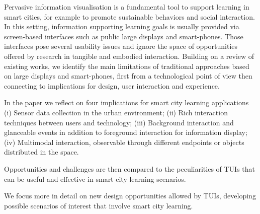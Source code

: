 Pervasive information visualisation is a fundamental tool to support learning in smart cities, for example to promote sustainable behaviors and social interaction. In this setting, information supporting learning goals is usually provided via screen-based interfaces such as public large displays and smart-phones. Those interfaces pose several usability issues and ignore the space of opportunities offered by research in tangible and embodied interaction.
Building on a review of existing works, we identify the main limitations of traditional approaches based on large displays and smart-phones, first from a technological point of view then connecting to implications for design, user interaction and experience.

In the paper we reflect on four implications for smart city learning applications (i) Sensor data collection in the urban environment; (ii) Rich interaction techniques between users and technology; (iii) Background interaction and glanceable events in addition to foreground interaction for information display; (iv) Multimodal interaction, observable through different endpoints or objects distributed in the space.

Opportunities and challenges are then compared to the peculiarities of TUIs that can be useful and effective in smart city learning scenarios.

We focus more in detail on new design opportunities allowed by TUIs, developing possible scenarios of interest that involve smart city learning.
